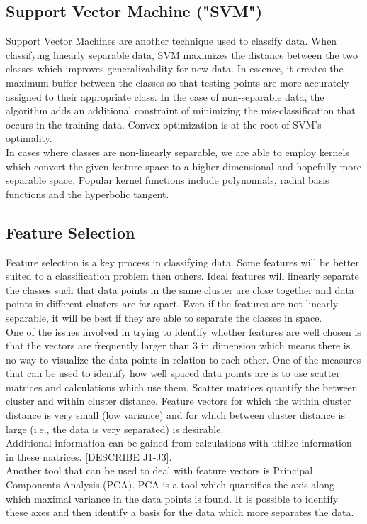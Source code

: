 \documentclass[12pt]{article}
\begin{document}
\subsection{Support Vector Machine ("SVM")}
Support Vector Machines are another technique used to classify data. When classifying linearly separable data, SVM maximizes the distance between the two classes which improves generalizability for new data. In essence, it creates the maximum buffer between the classes so that testing points are more accurately assigned to their appropriate class. In the case of non-separable data, the algorithm adds an additional constraint of minimizing the mis-classification that occurs in the training data. Convex optimization is at the root of SVM's optimality\cite{haykin2009neural}.\\
In cases where classes are non-linearly separable, we are able to employ kernels which convert the given feature space to a higher dimensional and hopefully more separable space. Popular kernel functions include polynomials, radial basis functions and the hyperbolic tangent\cite{theodoridis2009pattern}.
\subsection{Feature Selection}
Feature selection is a key process in classifying data. Some features will be better suited to a classification problem then others. Ideal features will linearly separate the classes such that data points in the same cluster are close together and data points in different clusters are far apart. Even if the features are not linearly separable, it will be best if they are able to separate the classes in space.\\
One of the issues involved in trying to identify whether features are well chosen is that the vectors are frequently larger than 3 in dimension which means there is no way to visualize the data points in relation to each other. One of the measures that can be used to identify how well spaced data points are is to use scatter matrices and calculations which use them. Scatter matrices quantify the between cluster and within cluster distance. Feature vectors for which the within cluster distance is very small (low variance) and for which between cluster distance is large (i.e., the data is very separated) is desirable. \\
Additional information can be gained from calculations with utilize information in these matrices. [DESCRIBE J1-J3].\\
Another tool that can be used to deal with feature vectors is Principal Components Analysis (PCA). PCA is a tool which quantifies the axis along which maximal variance in the data points is found. It is possible to identify these axes and then identify a basis for the data which more separates the data. 
\end{document}
